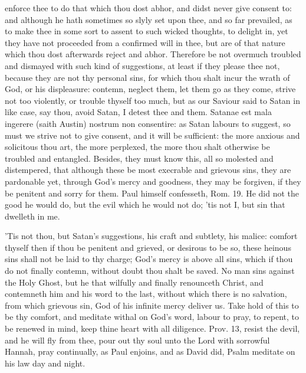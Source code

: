 {enforce thee to do that which thou dost abhor, and didst never give
consent to: and although he hath sometimes so slyly set upon thee, and
so far prevailed, as to make thee in some sort to assent to such wicked
thoughts, to delight in, yet they have not proceeded from a confirmed
will in thee, but are of that nature which thou dost afterwards reject
and abhor. Therefore be not overmuch troubled and dismayed with such
kind of suggestions, at least if they please thee not, because they are
not thy personal sins, for which thou shalt incur the wrath of God, or
his displeasure: contemn, neglect them, let them go as they come,
strive not too violently, or trouble thyself too much, but as our
Saviour said to Satan in like case, say thou, avoid Satan, I detest
thee and them. Satanae est mala ingerere (saith Austin) nostrum non
consentire: as Satan labours to suggest, so must we strive not to give
consent, and it will be sufficient: the more anxious and solicitous
thou art, the more perplexed, the more thou shalt otherwise be troubled
and entangled. Besides, they must know this, all so molested and
distempered, that although these be most execrable and grievous sins,
they are pardonable yet, through God's mercy and goodness, they may be
forgiven, if they be penitent and sorry for them. Paul himself
confesseth, Rom.  19. He did not the good he would do, but the
evil which he would not do; 'tis not I, but sin that dwelleth in me.

'Tis not thou, but Satan's suggestions, his craft and subtlety, his
malice: comfort thyself then if thou be penitent and grieved, or
desirous to be so, these heinous sins shall not be laid to thy charge;
God's mercy is above all sins, which if thou do not finally contemn,
without doubt thou shalt be saved. No man sins against the Holy
Ghost, but he that wilfully and finally renounceth Christ, and
contemneth him and his word to the last, without which there is no
salvation, from which grievous sin, God of his infinite mercy deliver
us. Take hold of this to be thy comfort, and meditate withal on God's
word, labour to pray, to repent, to be renewed in mind, keep thine
heart with all diligence. Prov.  13, resist the devil, and he will
fly from thee, pour out thy soul unto the Lord with sorrowful Hannah,
pray continually, as Paul enjoins, and as David did, Psalm  meditate
on his law day and night.

}
